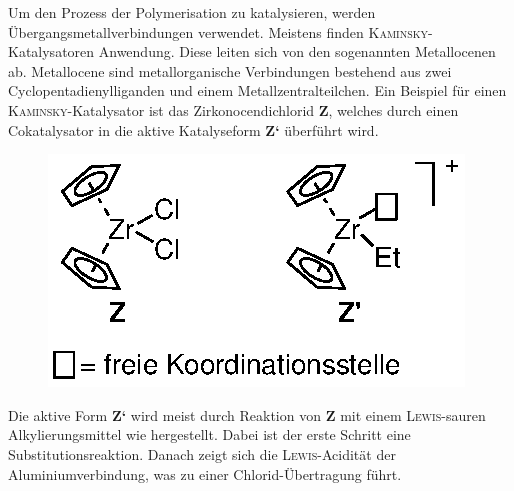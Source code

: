 \documentclass[../kl11.tex]{subfiles}
\begin{document}
 Um den Prozess der Polymerisation zu katalysieren, werden Übergangsmetallverbindungen verwendet. Meistens finden \textsc{Kaminsky}-Katalysatoren Anwendung. Diese leiten sich von den sogenannten Metallocenen ab. Metallocene sind metallorganische Verbindungen bestehend aus zwei Cyclopentadienylliganden und einem Metallzentralteilchen.
 Ein Beispiel für einen \textsc{Kaminsky}-Katalysator ist das Zirkonocendichlorid \textbf{Z}, welches durch einen Cokatalysator in die aktive Katalyseform \textbf{Z‘} überführt wird.
 \begin{figure}[H]
     \centering
     \includegraphics[width=0.6\linewidth]{2024/Abbildungen/Ziegler-Natta/ZZ.eps}
 \end{figure}
\newpage
 Die aktive Form \textbf{Z‘} wird meist durch Reaktion von \textbf{Z} mit einem \textsc{Lewis}-sauren Alkylierungsmittel wie  hergestellt. Dabei ist der erste Schritt eine Substitutionsreaktion. Danach zeigt sich die \textsc{Lewis}-Acidität der Aluminiumverbindung, was zu einer Chlorid-Übertragung führt.
\end{document}

